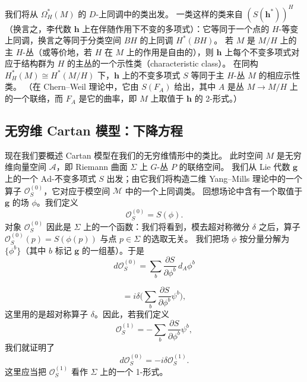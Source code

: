 我们将从 $\Omega^{*}_{H}(M)$ 的 $D$-上同调中的类出发。
一类这样的类来自 $\left(S(\mathbf{h}^{*})\right)^{H}$（换言之，李代数 $\mathbf{h}$ 上在伴随作用下不变的多项式）：它等同于一个点的 $H$-等变上同调，换言之等同于分类空间 $BH$ 的上同调 $H^{*}(BH)$。
若 $M$ 是 $M/H$ 上的主 $H$-丛（或等价地，若 $H$ 在 $M$ 上的作用是自由的），则 $\mathbf{h}$ 上每个不变多项式对应于结构群为 $H$ 的主丛的一个示性类（characteristic class）。
在同构 $H^{*}_{H}(M)\cong H^{*}(M/H)$ 下，$\mathbf{h}$ 上的不变多项式 $S$ 等同于主 $H$-丛 $M$ 的相应示性类。
（在 Chern–Weil 理论中，它由 $S(F_{A})$ 给出，其中 $A$ 是丛 $M\to M/H$ 上的一个联络，而 $F_{A}$ 是它的曲率，即 $M$ 上取值于 $\mathbf{h}$ 的 2-形式。）

\subsection{无穷维 Cartan 模型：下降方程}

现在我们要概述 Cartan 模型在我们的无穷维情形中的类比。
此时空间 $M$ 是无穷维向量空间 $\mathcal{A}$，即 Riemann 曲面 $\Sigma$ 上 $G$-丛 $P$ 的联络空间。
我们从 Lie 代数 $\mathbf{g}$ 上的一个 $\mathrm{Ad}$-不变多项式 $S$ 出发；由它我们将构造二维 Yang–Mills 理论中的一个算子 $\mathcal{O}_{S}^{(0)}$，它对应于模空间 $\mathcal{M}$ 中的一个上同调类。
回想场论中含有一个取值于 $\mathbf{g}$ 的场 $\phi$。我们定义
\begin{equation}
  \tag{11.11}
  \label{eq:11-11}
  \mathcal{O}_{S}^{(0)}=S(\phi).
\end{equation}
对象 $\mathcal{O}_{S}^{(0)}$ 因此是 $\Sigma$ 上的一个函数：我们将看到，模去超对称微分 $\delta$ 之后，算子 $\mathcal{O}_{S}^{(0)}(p)=S(\phi(p))$ 与点 $p\in\Sigma$ 的选取无关。
我们把场 $\phi$ 按分量分解为 $\{\phi^{b}\}$（其中 $b$ 标记 $\mathbf{g}$ 的一组基）。于是
\begin{equation}
  \tag{11.12}
  \label{eq:11-12}
  d\mathcal{O}_{S}^{(0)}=\sum_{b}\frac{\partial S}{\partial\phi^{b}}\,d_{A}\phi^{b}
\end{equation}

\begin{equation}
  \tag{11.13}
  \label{eq:11-13}
  =i\delta\Big(\sum_{b}\frac{\partial S}{\partial\phi^{b}}\psi^{b}\Big),
\end{equation}
这里用的是超对称算子 $\delta$。因此，若我们定义
\[
\mathcal{O}_{S}^{(1)}=-\sum_{b}\frac{\partial S}{\partial\phi^{b}}\psi^{b},
\]
我们就证明了
\begin{equation}
  \tag{11.14}
  \label{eq:11-14}
  d\mathcal{O}_{S}^{(0)}=-i\delta\mathcal{O}_{S}^{(1)}.
\end{equation}
这里应当把 $\mathcal{O}_{S}^{(1)}$ 看作 $\Sigma$ 上的一个 1-形式。

